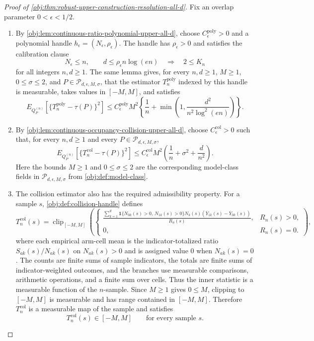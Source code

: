 \documentclass[11pt]{article}
\begin{document}
\begin{proof}[Proof of \cref{obj:thm:robust-upper-construction-resolution-all-d}]
Fix an overlap parameter \(0<\epsilon<1/2\).
\begin{enumerate}
\item By \cref{obj:lem:continuous-ratio-polynomial-upper-all-d}, choose
\(C_{\epsilon}^{\mathrm{poly}}>0\) and a polynomial handle
\(h_{\epsilon}=(N_{\epsilon},\rho_{\epsilon})\).  The handle has
\(\rho_{\epsilon}>0\) and satisfies the calibration clause
\[
N_{\epsilon}\le n,\qquad d\le \rho_{\epsilon}n\log(en)
\quad\Longrightarrow\quad
2\le K_n
\]
for all integers \(n,d\ge1\).  The same lemma gives, for every
\(n,d\ge1\), \(M\ge1\), \(0\le\sigma\le2\), and
\(P\in\mathcal P_{d,\epsilon,M,\sigma}\), that the estimator
\(T_n^{\mathrm{poly}}\) indexed by this handle is measurable, takes values in
\([-M,M]\), and satisfies
\[
E_{Q_P^{(n)}}\!\left[
\{T_n^{\mathrm{poly}}-\tau(P)\}^2
\right]
\le
C_{\epsilon}^{\mathrm{poly}}M^2
\left\{
\frac1n+\min\!\left(1,\frac{d^2}{n^2\log^2(en)}\right)
\right\}.
\]

\item By \cref{obj:lem:continuous-occupancy-collision-upper-all-d}, choose
\(C_{\epsilon}^{\mathrm{col}}>0\) such that, for every \(n,d\ge1\) and every
\(P\in\mathcal P_{d,\epsilon,M,\sigma}\),
\[
E_{Q_P^{(n)}}\!\left[
\{T_n^{\mathrm{col}}-\tau(P)\}^2
\right]
\le
C_{\epsilon}^{\mathrm{col}}M^2
\left(
\frac1n+\sigma^2+\frac{d}{n^2}
\right).
\]
Here the bounds \(M\ge1\) and \(0\le\sigma\le2\) are the corresponding
model-class fields in \(\mathcal P_{d,\epsilon,M,\sigma}\) from
\cref{obj:def:model-class}.

\item The collision estimator also has the required admissibility property.  For a
sample \(s\), \cref{obj:def:collision-handle} defines
\[
T_n^{\mathrm{col}}(s)
=
\operatorname{clip}_{[-M,M]}
\left(
\begin{cases}
\displaystyle
\frac{
\sum_{k=1}^d
\mathbf 1\{N_{0k}(s)>0,\,N_{1k}(s)>0\}
N_k(s)
\left(
\overline Y_{1k}(s)-\overline Y_{0k}(s)
\right)
}{R_n(s)},&R_n(s)>0,\\[2ex]
0,&R_n(s)=0.
\end{cases}
\right),
\]
where each empirical arm-cell mean is the indicator-totalized ratio
\(S_{ak}(s)/N_{ak}(s)\) on \(N_{ak}(s)>0\) and is assigned value \(0\) when
\(N_{ak}(s)=0\).  The counts are finite sums of sample indicators, the totals
are finite sums of indicator-weighted outcomes, and the branches use
measurable comparisons, arithmetic operations, and a finite sum over cells.
Thus the inner statistic is a measurable function of the \(n\)-sample.  Since
\(M\ge1\) gives \(0\le M\), clipping to \([-M,M]\) is measurable and has range
contained in \([-M,M]\).  Therefore \(T_n^{\mathrm{col}}\) is a measurable map
of the sample and satisfies
\[
T_n^{\mathrm{col}}(s)\in[-M,M]
\qquad\text{for every sample }s.
\]


\end{enumerate}
\end{proof}
\end{document}
